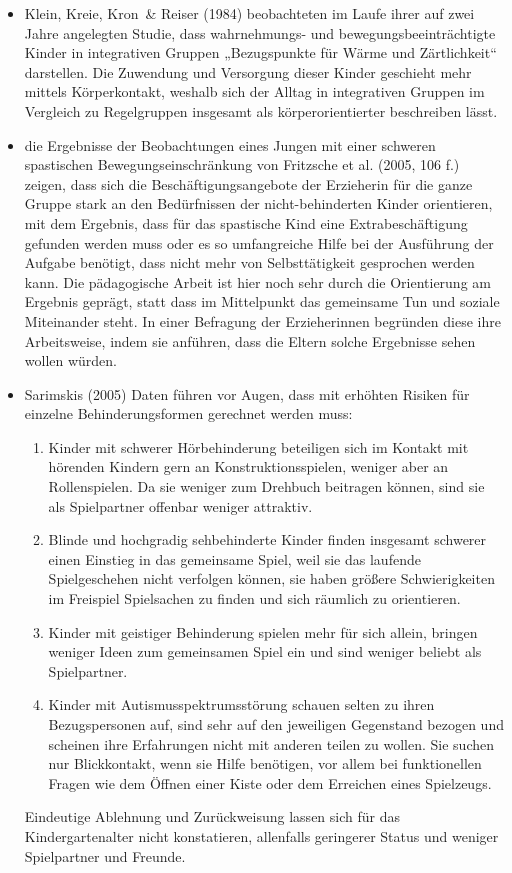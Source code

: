 \begin{itemize}
\item Klein, Kreie, Kron~\& Reiser (1984) beobachteten im Laufe ihrer auf zwei Jahre angelegten Studie, dass wahrnehmungs- und bewegungsbeeinträchtigte Kinder in integrativen Gruppen „Bezugspunkte für Wärme und Zärtlichkeit“ darstellen. Die Zuwendung und Versorgung dieser Kinder geschieht mehr mittels Körperkontakt, weshalb sich der Alltag in integrativen Gruppen im Vergleich zu Regelgruppen insgesamt als körperorientierter beschreiben lässt. 

\item die Ergebnisse der Beobachtungen eines Jungen mit einer schweren spastischen Bewegungseinschränkung von Fritzsche et al. (2005, 106 f.)  zeigen, dass sich die Beschäftigungsangebote der Erzieherin für die ganze Gruppe stark an den Bedürfnissen der nicht-behinderten Kinder orientieren, mit dem Ergebnis, dass für das spastische Kind eine Extrabeschäftigung gefunden werden muss oder es so umfangreiche Hilfe bei der Ausführung der Aufgabe benötigt, dass nicht mehr von Selbsttätigkeit gesprochen werden kann. Die pädagogische Arbeit ist hier noch sehr durch die Orientierung am Ergebnis geprägt, statt dass im Mittelpunkt das gemeinsame Tun und soziale Miteinander steht. In einer Befragung der Erzieherinnen begründen diese ihre Arbeitsweise, indem sie anführen, dass die Eltern solche Ergebnisse sehen wollen würden.

\item Sarimskis (2005) Daten führen vor Augen, dass mit erhöhten Risiken für einzelne Behinderungsformen gerechnet werden muss:
\begin{enumerate}
\item Kinder mit schwerer Hörbehinderung beteiligen sich im Kontakt mit hörenden Kindern gern an Konstruktionsspielen, weniger aber an Rollenspielen. Da sie weniger zum Drehbuch beitragen können, sind sie als Spielpartner offenbar weniger attraktiv.
\item Blinde und hochgradig sehbehinderte Kinder finden insgesamt schwerer einen Einstieg in das gemeinsame Spiel, weil sie das laufende Spielgeschehen nicht verfolgen können, sie haben größere Schwierigkeiten im Freispiel Spielsachen zu finden und sich räumlich zu orientieren.
\item Kinder mit geistiger Behinderung spielen mehr für sich allein, bringen weniger Ideen zum gemeinsamen Spiel ein und sind weniger beliebt als Spielpartner.
\item Kinder mit Autismusspektrumsstörung schauen selten zu ihren Bezugspersonen auf, sind sehr auf den jeweiligen Gegenstand bezogen und scheinen ihre Erfahrungen nicht mit anderen teilen zu wollen. Sie suchen nur Blickkontakt, wenn sie Hilfe benötigen, vor allem bei funktionellen Fragen wie dem Öffnen einer Kiste oder dem Erreichen eines Spielzeugs. 
\end{enumerate}
Eindeutige Ablehnung und Zurückweisung lassen sich für das Kindergartenalter nicht konstatieren, allenfalls geringerer Status und weniger Spielpartner und Freunde.
\end{itemize}